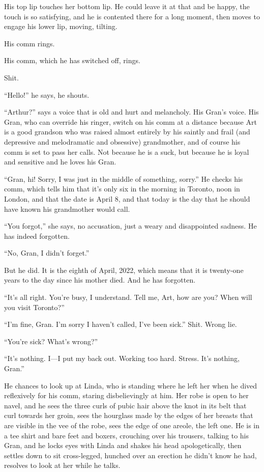 His top lip touches her bottom lip. He could leave it at that and
be happy, the touch is so satisfying, and he is contented there for
a long moment, then moves to engage his lower lip, moving,
tilting.

His comm rings.

His comm, which he has switched off, rings.

Shit.

“Hello!” he says, he shouts.

“Arthur?” says a voice that is old and hurt and melancholy. His
Gran’s voice. His Gran, who can override his ringer, switch on his
comm at a distance because Art is a good grandson who was raised
almost entirely by his saintly and frail (and depressive and
melodramatic and obsessive) grandmother, and of course his comm is
set to pass her calls. Not because he is a suck, but because he is
loyal and sensitive and he loves his Gran.

“Gran, hi! Sorry, I was just in the middle of something, sorry.” He
checks his comm, which tells him that it’s only six in the morning
in Toronto, noon in London, and that the date is April 8, and that
today is the day that he should have known his grandmother would
call.

“You forgot,” she says, no accusation, just a weary and
disappointed sadness. He has indeed forgotten.

“No, Gran, I didn’t forget.”

But he did. It is the eighth of April, 2022, which means that it is
twenty-one years to the day since his mother died. And he has
forgotten.

“It’s all right. You’re busy, I understand. Tell me, Art, how are
you? When will you visit Toronto?”

“I’m fine, Gran. I’m sorry I haven’t called, I’ve been sick.” Shit.
Wrong lie.

“You’re sick? What’s wrong?”

“It’s nothing. I—I put my back out. Working too hard. Stress. It’s
nothing, Gran.”

He chances to look up at Linda, who is standing where he left her
when he dived reflexively for his comm, staring disbelievingly at
him. Her robe is open to her navel, and he sees the three curls of
pubic hair above the knot in its belt that curl towards her groin,
sees the hourglass made by the edges of her breasts that are
visible in the vee of the robe, sees the edge of one areole, the
left one. He is in a tee shirt and bare feet and boxers, crouching
over his trousers, talking to his Gran, and he locks eyes with
Linda and shakes his head apologetically, then settles down to sit
cross-legged, hunched over an erection he didn’t know he had,
resolves to look at her while he talks.

